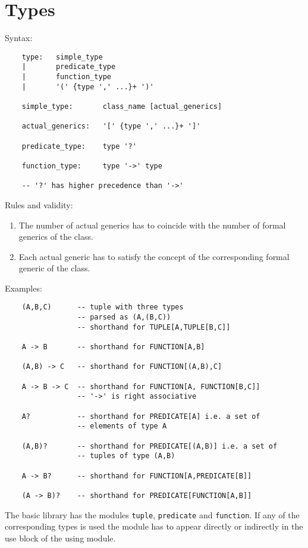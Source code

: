 \section{Types}

\noindent Syntax:
\begin{lstlisting}
    type:   simple_type
    |       predicate_type
    |       function_type
    |       '(' {type ',' ...}+ ')'

    simple_type:       class_name [actual_generics]

    actual_generics:   '[' {type ',' ...}+ ']'

    predicate_type:    type '?'

    function_type:     type '->' type

    -- '?' has higher precedence than '->'
\end{lstlisting}


\noindent Rules and validity:
\begin{enumerate}
\item The number of actual generics has to coincide with the number of formal
  generics of the class.

\item Each actual generic has to satisfy the concept of the corresponding
  formal generic of the class.
\end{enumerate}

\noindent Examples:
%
\begin{lstlisting}
    (A,B,C)      -- tuple with three types
                 -- parsed as (A,(B,C))
                 -- shorthand for TUPLE[A,TUPLE[B,C]]

    A -> B       -- shorthand for FUNCTION[A,B]

    (A,B) -> C   -- shorthand for FUNCTION[(A,B),C]

    A -> B -> C  -- shorthand for FUNCTION[A, FUNCTION[B,C]]
                 -- '->' is right associative

    A?           -- shorthand for PREDICATE[A] i.e. a set of
                 -- elements of type A

    (A,B)?       -- shorthand for PREDICATE[(A,B)] i.e. a set of
                 -- tuples of type (A,B)

    A -> B?      -- shorthand for FUNCTION[A,PREDICATE[B]]

    (A -> B)?    -- shorthand for PREDICATE[FUNCTION[A,B]]
\end{lstlisting}

The basic library has the modules \lstinline!tuple!, \lstinline!predicate! and
\lstinline!function!. If any of the corresponding types is used the module has
to appear directly or indirectly in the use block of the using module.



